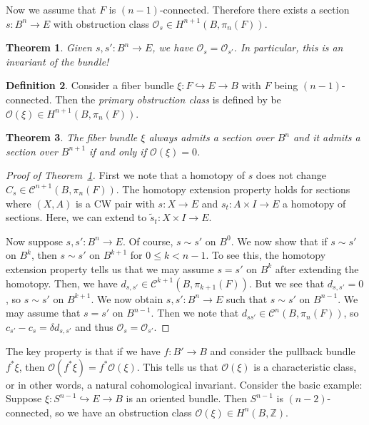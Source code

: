 \documentclass[leqno, openany]{memoir}
\newtheorem{thm}{Theorem}[section]
\theoremstyle{definition}
\newtheorem{defn}[thm]{Definition}
\theoremstyle{remark}
\theoremstyle{plain}
\theoremstyle{definition}
\theoremstyle{remark}
\newcommand{\Z}{\mathbb{Z}}
\newcommand{\mc}[1]{\mathcal{#1}}
\newcommand{\wt}[1]{\widetilde{#1}}
\begin{document}
Now we assume that $F$ is $(n-1)$-connected. Therefore there exists a section $s \colon B^n \to E$ with obstruction class $\mc{O}_s \in H^{n+1}(B, \pi_n(F))$.

\begin{thm}\label{thm:obstA}
    Given $s, s' \colon B^n \to E$, we have $\mc{O}_s = \mc{O}_{s'}$. In particular, this is an \textit{invariant} of the bundle!
\end{thm}

\begin{defn}
    Consider a fiber bundle $\xi \colon F \hookrightarrow E \to B$ with $F$ being $(n-1)$-connected. Then the \textit{primary obstruction class} is defined by be $\mc{O}(\xi) \in H^{n+1}(B, \pi_n(F))$.
\end{defn}

\begin{thm}
    The fiber bundle $\xi$ always admits a section over $B^n$ and it admits a section over $B^{n+1}$ if and only if $\mc{O}(\xi) = 0$.
\end{thm}

\begin{proof}[Proof of Theorem~\ref{thm:obstA}]
    First we note that a homotopy of $s$ does not change $C_s \in \mc{C}^{n+1}(B, \pi_n(F))$. The homotopy extension property holds for sections where $(X, A)$ is a CW pair with $s \colon X \to E$ and $s_t \colon A \times I \to E$ a homotopy of sections. Here, we can extend to $\wt{s}_t \colon X \times I \to E$.

    Now suppose $s, s' \colon B^n \to E$. Of course, $s \sim s'$ on $B^0$. We now show that if $s \sim s'$ on $B^k$, then $s \sim s'$ on $B^{k+1}$ for $0 \leq k < n-1$. To see this, the homotopy extension property tells us that we may assume $s = s'$ on $B^k$ after extending the homotopy. Then, we have $d_{s,s'} \in \mc{C}^{k+1}(B, \pi_{k+1}(F))$. But we see that $d_{s,s'} = 0$, so $s \sim s'$ on $B^{k+1}$. We now obtain $s, s' \colon B^n \to E$ such that $s \sim s'$ on $B^{n-1}$. We may assume that $s = s'$ on $B^{n-1}$. Then we note that $d_{ss'} \in \mc{C}^n(B, \pi_n(F))$, so $c_{s'} - c_s = \delta d_{s,s'}$ and thus $\mc{O}_s = \mc{O}_{s'}$.
\end{proof}

The key property is that if we have $f \colon B' \to B$ and consider the pullback bundle $f^* \xi$, then $\mc{O}(f^* \xi) = f^* \mc{O}(\xi)$. This tells us that $\mc{O}(\xi)$ is a characteristic class, or in other words, a natural cohomological invariant. Consider the basic example: Suppose $\xi \colon S^{n-1} \hookrightarrow E \to B$ is an oriented bundle. Then $S^{n-1}$ is $(n-2)$-connected, so we have an obstruction class $\mc{O}(\xi) \in H^n(B, \Z)$.
\end{document}
